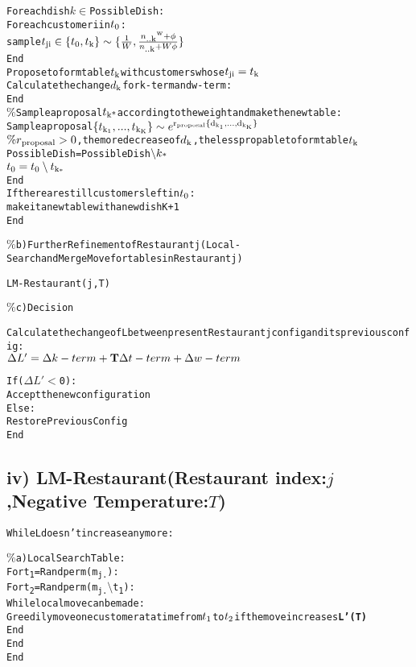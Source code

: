 \documentclass{article}
\begin{document}
\begin{spacing}{1.1}
\begin{alltt}
      For each dish \(k\in\)Possible Dish:          
          For each customer i in \(t\textsubscript{0}\):
              sample \(t\textsubscript{ji}\in\{t\textsubscript{0},t\textsubscript{k}\}\sim\{\frac{1}{W},\frac{n\textsubscript{..k}\textsuperscript{w}+\phi}{n\textsubscript{..k}+W\phi}\}\)                
          End
      Propose to form table \(t\textsubscript{k}\) with customers whose \(t\textsubscript{ji}=t\textsubscript{k}\)
      Calculate the change \(d\textsubscript{k}\) for k-term and w-term:
      End
      \(\%\)Sample a proposal \(t\textsubscript{k*}\) according to the weight and make the new table:
      Sample a proposal \(\{t\textsubscript{k\textsubscript{1}},...,t\textsubscript{k\textsubscript{K}}\}\sim e\textsuperscript{r\textsubscript{proposal}\{d\textsubscript{k\textsubscript{1}},...,d\textsubscript{k\textsubscript{K}}\}}\)
      \(\%r\textsubscript{proposal}>0\), the more decrease of \(d\textsubscript{k}\), the less propable to form table \(t\textsubscript{k}\)
      Possible Dish=Possible Dish\(\setminus k\textsubscript{*}\)
      \(t\textsubscript{0}=t\textsubscript{0} \setminus t\textsubscript{k\textsubscript{*}}\)
End
If there are still customers left in \(t\textsubscript{0}\):
   make it a new table with a new dish K+1
End

\(\%\)b)Further Refinement of Restaurant j(Local-Search and Merge Move for tables in Restaurant j)

LM-Restaurant(j,T)

\(\%\)c)Decision

Calculate the change of L between present Restaurant j config and its previous config: 
\(\Delta L'=\Delta k-term+{\bf T}\Delta t-term+\Delta w-term\)

If(\(\Delta L'<\)0):
    Accept the new configuration
Else:
    Restore Previous Config
End    
\end{alltt}



\subsection{iv) LM-Restaurant(Restaurant index:$j$,Negative Temperature:$T$)}
\begin{alltt}
While L doesn't increase any more:
      
     \(\%\)a)Local Search Table:
        For t\textsubscript{1}=Randperm(m\textsubscript{j.}):
             For t\textsubscript{2}=Randperm(m\textsubscript{j.}\(\setminus\) t\textsubscript{1}):
                While local move can be made:
                      Greedily move one customer at a time from \(t\textsubscript{1}\) to \(t\textsubscript{2}\) if the move increases {\bf L'(T)} 
                End
             End
        End
     

\end{alltt}
\end{spacing}
\end{document}
